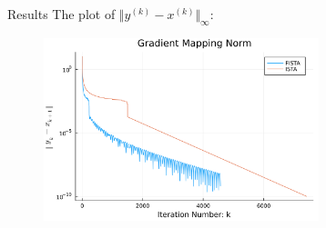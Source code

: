 \documentclass[11pt]{beamer}
\begin{document}
        \begin{frame}{Results}
            The plot of $\Vert y^{(k)} - x^{(k)}\Vert_\infty$:
            \begin{figure}[h]
                \centering
                \includegraphics[width=8cm]{simple_lass_pgrad.png}
            \end{figure}
        \end{frame}
\end{document}
